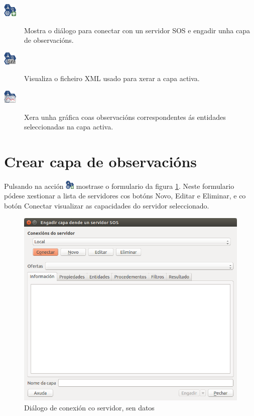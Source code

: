 \begin{description}
\item [{\includegraphics[width=24px]{images/manual/icon_add.png}}] Mostra o diálogo para conectar con un servidor SOS e engadir unha capa de observacións. 
\item [{\includegraphics[width=24px]{images/manual/icon_xml.png}}] Visualiza o ficheiro XML usado para xerar a capa activa. 
\item [{\includegraphics[width=24px]{images/manual/icon_plot.png}}] Xera unha gráfica coas observacións correspondentes ás entidades seleccionadas na capa activa.
\end{description}

\section{Crear capa de observacións}
Pulsando na acción \includegraphics[width=16px]{images/manual/icon_add.png} mostrase o formulario da figura \ref{fig:tabInfo-limpia}. Neste formulario pódese xestionar a lista de servidores cos botóns Novo, Editar e Eliminar, e co botón Conectar visualizar as capacidades do servidor seleccionado.
\begin{figure}[hbtp]
\centering
\includegraphics[width=\textwidth]{images/manual/tabInfo-limpia.png}
\caption{Diálogo de conexión co servidor, sen datos}
\label{fig:tabInfo-limpia}
\end{figure}

